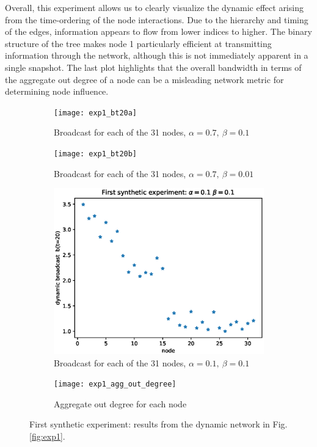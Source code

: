 Overall, this experiment allows us to clearly visualize the dynamic effect arising from the time-ordering of the node interactions. Due to the hierarchy and timing of the edges, information appears to flow from lower indices to higher. The binary structure of the tree makes node 1 particularly efficient at transmitting information through the network, although this is not immediately apparent in a single snapshot. The last plot highlights that the overall bandwidth in terms of the aggregate out degree of a node can be a misleading network metric for determining node influence.

\begin{figure}[h]
     \centering
     \begin{subfigure}[b]{0.49\textwidth}
         \centering
         \texttt{[image: exp1\_bt20a]}
         \caption{Broadcast for each of the 31 nodes, $\alpha = 0.7 ,~\beta = 0.1$}
         \label{fig:bt1}
     \end{subfigure}
     \begin{subfigure}[b]{0.49\textwidth}
         \centering
         \texttt{[image: exp1\_bt20b]}
         \caption{Broadcast for each of the 31 nodes, $\alpha = 0.7 ,~\beta = 0.01$}
         \label{fig:bt2}
     \end{subfigure}
     
     \begin{subfigure}[b]{0.49\textwidth}
         \centering
         \includegraphics[width=\textwidth]{exp1_bt20c}
         \caption{Broadcast for each of the 31 nodes, $\alpha = 0.1 ,~\beta = 0.1$}
         \label{fig:bt3}
     \end{subfigure}
     \begin{subfigure}[b]{0.49\textwidth}
         \centering
         \texttt{[image: exp1\_agg\_out\_degree]}
         \caption{Aggregate out degree for each node}
         \label{fig:bt4}
     \end{subfigure}
        \caption{First synthetic experiment: results from the dynamic network in Fig. \ref{fig:exp1}.}
        \label{fig:fourbt}
\end{figure}


